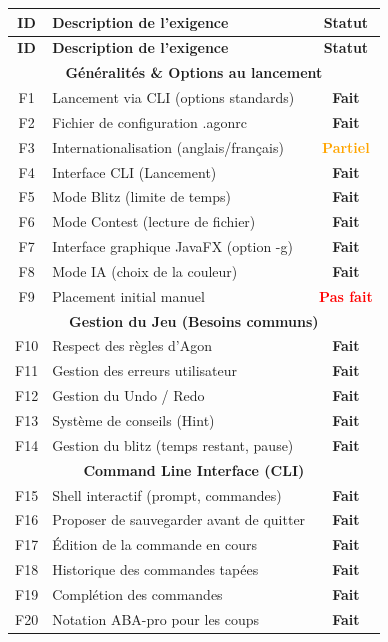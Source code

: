\documentclass[a4paper]{article}
\newcommand{\fait}{\textcolor{green!70!black}{\textbf{Fait}}}
\newcommand{\partiel}{\textcolor{orange}{\textbf{Partiel}}}
\newcommand{\pasfait}{\textcolor{red}{\textbf{Pas fait}}}
\begin{document}
\begin{center}
\begin{longtable}{|c|p{8.5cm}|c|}
\hline
\textbf{ID} & \textbf{Description de l'exigence} & \textbf{Statut} \\
\hline
\endfirsthead
\hline
\textbf{ID} & \textbf{Description de l'exigence} & \textbf{Statut} \\
\hline
\endhead

\multicolumn{3}{|c|}{\cellcolor{gray!20}\textbf{Généralités \& Options au lancement}} \\ \hline
F1 & Lancement via CLI (options standards)  & \fait \\ \hline
F2 & Fichier de configuration .agonrc  & \fait \\ \hline
F3 & Internationalisation (anglais/français)  & \partiel \\ \hline
F4 & Interface CLI (Lancement)  & \fait \\ \hline
F5 & Mode Blitz (limite de temps)  & \fait \\ \hline
F6 & Mode Contest (lecture de fichier)  & \fait \\ \hline
F7 & Interface graphique JavaFX (option -g)  & \fait \\ \hline
F8 & Mode IA (choix de la couleur)  & \fait \\ \hline
F9 & Placement initial manuel  & \pasfait \\ \hline

\multicolumn{3}{|c|}{\cellcolor{gray!20}\textbf{Gestion du Jeu (Besoins communs)}} \\ \hline
F10 & Respect des règles d'Agon  & \fait \\ \hline
F11 & Gestion des erreurs utilisateur  & \fait \\ \hline
F12 & Gestion du Undo / Redo  & \fait \\ \hline
F13 & Système de conseils (Hint)  & \fait \\ \hline
F14 & Gestion du blitz (temps restant, pause)  & \fait \\ \hline

\multicolumn{3}{|c|}{\cellcolor{gray!20}\textbf{Command Line Interface (CLI)}} \\ \hline
F15 & Shell interactif (prompt, commandes)  & \fait \\ \hline
F16 & Proposer de sauvegarder avant de quitter  & \fait \\ \hline
F17 & Édition de la commande en cours  & \fait \\ \hline
F18 & Historique des commandes tapées  & \fait \\ \hline
F19 & Complétion des commandes  & \fait \\ \hline
F20 & Notation ABA-pro pour les coups  & \fait \\ \hline


\end{longtable}
\end{center}
\end{document}

